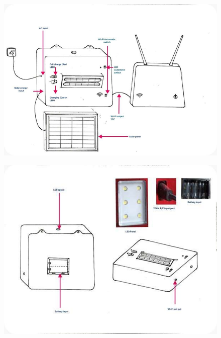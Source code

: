 \documentclass[twocolumn]{article}
\begin{document}
\begin{titlepage}
\begin{figure}[h]
    \end{figure}  

    \begin{figure}[h]
        \centering
        \includegraphics{21.png}
        \label{fig:enter-label}
    \end{figure}

    \begin{figure}[h]
        \centering
        \includegraphics{22.png}
        \label{fig:enter-label}
    \end{figure}

    \newpage
\end{titlepage}
\end{document}
